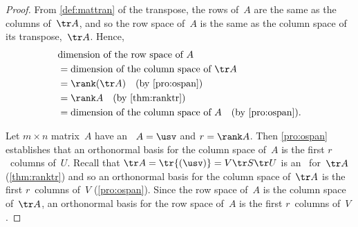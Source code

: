 \begin{proof} 
From \cref{def:mattran} of the transpose, the rows of~\(A\) are the same as the columns of~\(\tr A\), and so the row space of~\(A\) is the same as the column space of its transpose,~\(\tr A\).  
Hence,
\begin{align*}
&\text{dimension of the row space of }A
\\&=\text{dimension of the column space of }\tr A
\\&=\rank(\tr A) \quad(\text{by \cref{pro:ospan}})
\\&=\rank A \quad(\text{by \cref{thm:ranktr}})
\\&=\text{dimension of the column space of }A
\quad(\text{by \cref{pro:ospan}}).
\end{align*}

Let \(m\times n\) matrix~\(A\) have an \svd\ \(A=\usv\) and \(r=\rank A\).
Then \cref{pro:ospan} establishes that an orthonormal basis for the column space of~\(A\) is the first \(r\)~columns of~\(U\).
Recall that \(\tr A=\tr{(\usv)} =V\tr S\tr U\) is an \svd\ for~\(\tr A\) (\cref{thm:ranktr}) and so an orthonormal basis for the column space of~\(\tr A\) is the first \(r\)~columns of~\(V\) (\cref{pro:ospan}).
Since the row space of~\(A\) is the column space of~\(\tr A\), an orthonormal basis for the row space of~\(A\) is the first \(r\)~columns of~\(V\).
\end{proof}


